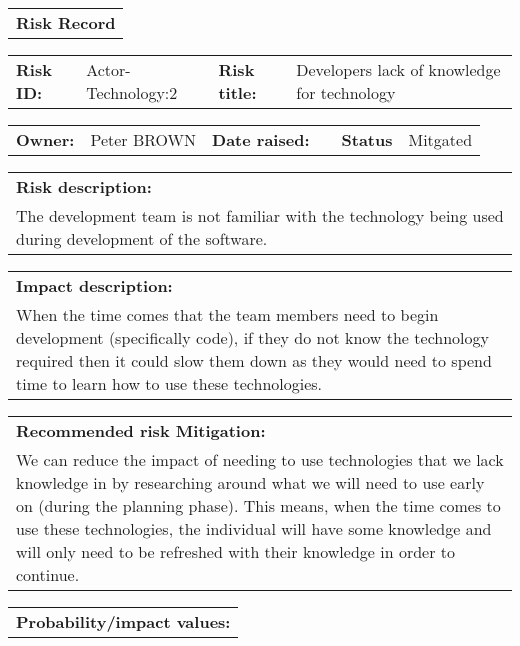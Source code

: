 \begin{table}
	\begin{tabularx}{\textwidth}{| X |}
		\hline
		\textbf{Risk Record} \\
	\end{tabularx}
	\begin{tabularx}{\textwidth}{| l | X | l | X |}
		\hline
		\textbf{Risk ID:} & Actor-Technology:2 & \textbf{Risk title:} & Developers lack of knowledge for technology \\
	\end{tabularx}
	\begin{tabularx}{\textwidth}{| l | X | l | X | l | X |}
		\hline
		\textbf{Owner:} & Peter BROWN & \textbf{Date raised:} &  & \textbf{Status} & Mitgated \\
	\end{tabularx}
	\begin{tabularx}{\textwidth}{| X |}
		\hline
		\textbf{Risk description:} \\ The development team is not familiar with the technology being used during development of the software.  \\
	\end{tabularx}
	\begin{tabularx}{\textwidth}{| X |}
		\hline
		\textbf{Impact description:} \\ When the time comes that the team members need to begin development (specifically code), if they do not know the technology required then it could slow them down as they would need to spend time to learn how to use these technologies. \\
	\end{tabularx}
	\begin{tabularx}{\textwidth}{| X |}
		\hline
		\textbf{Recommended risk Mitigation:} \\ We can reduce the impact of needing to use technologies that we lack knowledge in by researching around what we will need to use early on (during the planning phase). This means, when the time comes to use these technologies, the individual will have some knowledge and will only need to be refreshed with their knowledge in order to continue. \\
	\end{tabularx}
	\begin{tabularx}{\textwidth}{| X |}
		\hline
		\textbf{Probability/impact values:} \\
	\end{tabularx}
	\begin{tabularx}{\textwidth}{| l | l | X | X | X |}

\end{tabularx}
\end{table}
